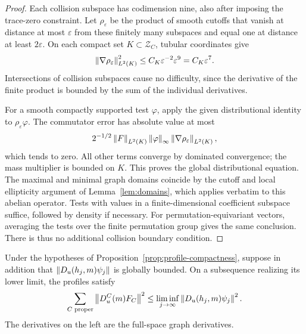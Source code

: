 \begin{proof}
Each collision subspace has codimension nine, also after imposing the
trace-zero constraint. Let \(\rho_\varepsilon\) be the product of smooth
cutoffs that vanish at distance at most \(\varepsilon\) from these finitely
many subspaces and equal one at distance at least \(2\varepsilon\). On
each compact set \(K\subset \mathcal Z_C\), tubular coordinates give
\begin{equation}\label{prof:collision-capacity}
 \left\lVert \nabla\rho_\varepsilon\right\rVert_{L^2(K)}^2
 \le C_K\varepsilon^{-2}\varepsilon^9=C_K\varepsilon^7.
\end{equation}
Intersections of collision subspaces cause no difficulty, since the
derivative of the finite product is bounded by the sum of the individual
derivatives.

For a smooth compactly supported test \(\varphi\), apply the given
distributional identity to \(\rho_\varepsilon\varphi\). The commutator
error has absolute value at most
\[
 2^{-1/2}\left\lVert F\right\rVert_{L^2(K)}\left\lVert \varphi\right\rVert_\infty
                    \left\lVert \nabla\rho_\varepsilon\right\rVert_{L^2(K)},
\]
which tends to zero. All other terms converge by dominated convergence;
the mass multiplier is bounded on \(K\). This proves the global
distributional equation. The maximal and minimal graph domains coincide
by the cutoff and local ellipticity argument of Lemma~\ref{lem:domains},
which applies verbatim to this abelian operator. Tests with values in a
finite-dimensional coefficient subspace suffice, followed by density if
necessary. For permutation-equivariant vectors, averaging the tests over
the finite permutation group gives the same conclusion. There is thus no
additional collision boundary condition.
\end{proof}

\begin{proposition}
\label{prop:profile-liminf}
Under the hypotheses of Proposition~\ref{prop:profile-compactness}, suppose
in addition that \(\left\lVert D_u(h_j,m)\psi_j\right\rVert\) is globally bounded. On a
subsequence realizing its lower limit, the profiles satisfy
\begin{equation}\label{eq:profile-liminf}
 \sum_{C\text{ proper}}\left\lVert D_u^C(m)F_C\right\rVert^2
       \le\liminf_{j\to\infty}\left\lVert D_u(h_j,m)\psi_j\right\rVert^2.
\end{equation}
The derivatives on the left are the full-space graph derivatives.
\end{proposition}

